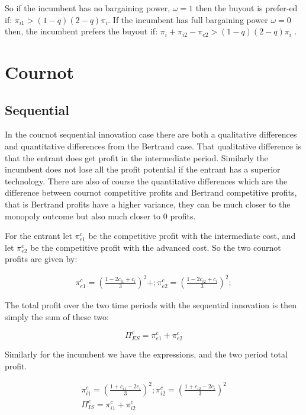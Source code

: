 \documentclass[11pt]{article}
\begin{document}
So if the incumbent has no bargaining power, $\omega=1$ then the buyout is prefer-ed if: $ \pi_{i1} >(1-q)(2-q)\pi_i$. If the incumbent has full bargaining power $\omega=0$ then, the incumbent prefers the buyout if: $\pi_i+\pi_{i2}-\pi_{e2} >(1-q)(2-q)\pi_i$ .


\section*{Cournot}

\subsection*{Sequential}

In the cournot sequential innovation case there are both a qualitative differences and quantitative differences from the Bertrand case. That qualitative difference is that the entrant does get profit in the intermediate period. Similarly the incumbent does not lose all the profit potential if the entrant has a superior technology. There are also of course the quantitative differences which are the difference between cournot competitive profits and Bertrand competitive profits, that is Bertrand profits have a higher variance, they can be much closer to the monopoly outcome but also much closer to 0 profits. 

For the entrant let $\pi_{e1}^{c}$ be the competitive profit with the intermediate cost, and let $\pi_{e2}^{c}$ be the competitive profit with the advanced cost. So the two cournot profits are given by: 

\begin{align*}
\pi_{e1}^{c} = \left(\frac{1-2 c_{i1}+c_{i}}{3}  \right)^2+;
\pi_{e2}^{c} = \left(\frac{1-2 c_{i2}+c_{i}}{3}  \right)^2;
\end{align*}

The total profit over the two time periods with the sequential innovation is then simply the sum of these two:

\begin{equation*}
\Pi_{ES}^{c} = \pi_{e1}^{c}+\pi_{e2}^{c}
\end{equation*}

Similarly for the incumbent we have the expressions, and the two period total profit. 

\begin{align*}
&\pi_{i1}^{c} = \left(\frac{1+ c_{i1}-2c_{i}}{3}  \right)^2;
\pi_{i2}^{c} = \left(\frac{1+ c_{i2}-2c_{i}}{3}  \right)^2 \\
&\Pi_{IS}^{c} = \pi_{i1}^{c}+\pi_{i2}^{c}&
\end{align*}
\end{document}
